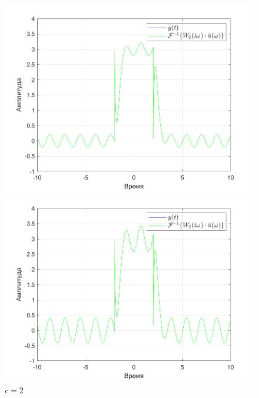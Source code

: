 \documentclass[a4paper]{article}
\begin{document}
\begin{figure}[H]
    \begin{minipage}{0.5\textwidth}
        \centering
        \includegraphics[width=\linewidth]{ex1_2/a1=0_a2=25_b1=10.5_b2=25_d=4_c=1/h3.png}
        \caption{$c=1$}
    \end{minipage}
    \begin{minipage}{0.5\textwidth}
        \centering
        \includegraphics[width=\linewidth]{ex1_2/a1=0_a2=25_b1=10.5_b2=25_d=4_c=2/h3.png}
        \caption{$c=2$}
    \end{minipage}
\end{figure}
\end{document}
